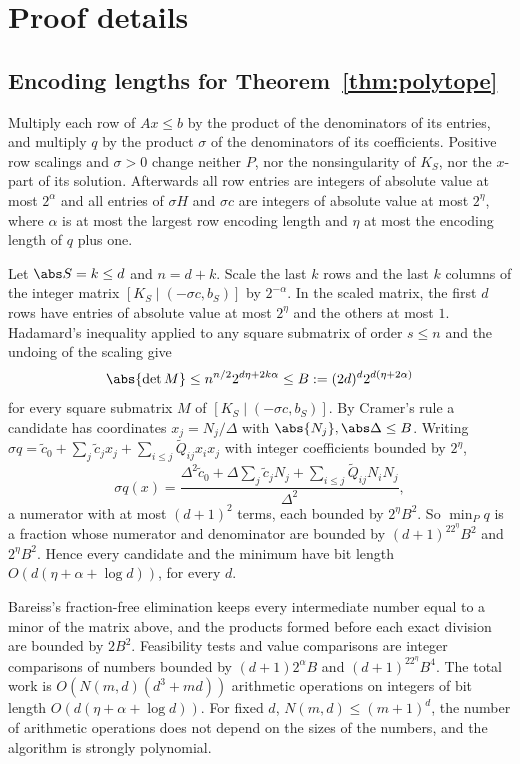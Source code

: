 \section{Proof details}\label{app:proofs}

\subsection{Encoding lengths for Theorem~\ref{thm:polytope}}\label{app:polytope}

Multiply each row of $Ax\le b$ by the product of the denominators of its
entries, and multiply $q$ by the product $\sigma$ of the denominators of its
coefficients. Positive row scalings and $\sigma>0$ change neither $P$, nor
the nonsingularity of $K_S$, nor the $x$-part of its solution. Afterwards
all row entries are integers of absolute value at most $2^{\alpha}$ and all
entries of $\sigma H$ and $\sigma c$ are integers of absolute value at most
$2^{\eta}$, where $\alpha$ is at most the largest row encoding length and
$\eta$ at most the encoding length of $q$ plus one.

Let $\abs S=k\le d$ and $n=d+k$. Scale the last $k$ rows and the last $k$
columns of the integer matrix $[K_S\mid(-\sigma c,b_S)]$ by $2^{-\alpha}$. In
the scaled matrix, the first $d$ rows have entries of absolute value at
most $2^\eta$ and the others at most $1$. Hadamard's inequality applied to
any square submatrix of order $s\le n$ and the undoing of the scaling give
\[
\abs{\det M}\le n^{n/2}2^{d\eta+2k\alpha}\le B:=(2d)^d2^{d(\eta+2\alpha)}
\]
for every square submatrix $M$ of $[K_S\mid(-\sigma c,b_S)]$. By Cramer's
rule a candidate has coordinates $x_j=N_j/\Delta$ with
$\abs{N_j},\abs\Delta\le B$. Writing $\sigma q=\tilde c_0+\sum_j\tilde c_jx_j+\sum_{i\le j}\tilde Q_{ij}x_ix_j$
with integer coefficients bounded by $2^\eta$,
\[
\sigma q(x)=\frac{\Delta^2\tilde c_0+\Delta\sum_j\tilde c_jN_j+\sum_{i\le j}\tilde Q_{ij}N_iN_j}{\Delta^2},
\]
a numerator with at most $(d+1)^2$ terms, each bounded by $2^\eta B^2$. So
$\min_Pq$ is a fraction whose numerator and denominator are bounded by
$(d+1)^22^{\eta}B^2$ and $2^{\eta}B^2$. Hence every candidate and
the minimum have bit length $O(d(\eta+\alpha+\log d))$, for every $d$.

Bareiss's fraction-free elimination keeps every intermediate number equal
to a minor of the matrix above, and the products formed before each exact
division are bounded by $2B^2$. Feasibility tests and value comparisons
are integer comparisons of numbers bounded by $(d+1)2^\alpha B$ and
$(d+1)^22^\eta B^4$. The total work is $O(N(m,d)(d^3+md))$ arithmetic
operations on integers of bit length $O(d(\eta+\alpha+\log d))$. For fixed
$d$, $N(m,d)\le(m+1)^d$, the number of arithmetic operations does not
depend on the sizes of the numbers, and the algorithm is strongly
polynomial.

